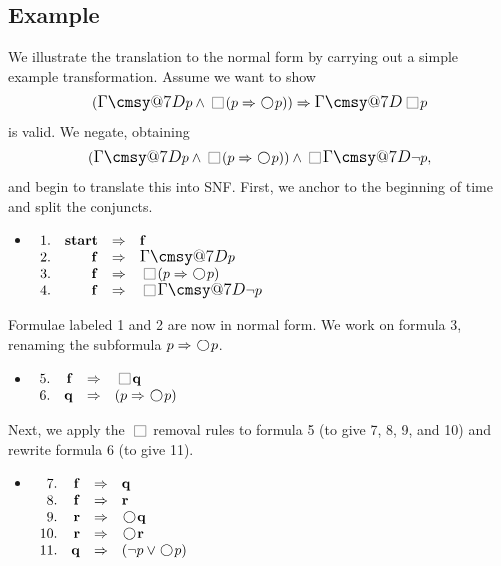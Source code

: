 \documentclass[nohyperref]{acmtrans2f}
\makeatletter
\def\sometime{\mathord{\hbox{\large$\mathchar"0\cmsy@7D$}}}
\newcommand{\always}{\raisebox{-.2ex}{
                           \mbox{\unitlength=0.9ex
                           \begin{picture}(2,2)
                           \linethickness{0.06ex}
                           \put(0,0){\line(1,0){2}}
                           \put(0,2){\line(1,0){2}}
                           \put(0,0){\line(0,1){2}}
                           \put(2,0){\line(0,1){2}}
                           \end{picture}}}
                          \,}
\newcommand{\next}{\!\raisebox{-.2ex}{ %
                        \mbox{\unitlength=0.9ex
                        \begin{picture}(2,2)
                        \linethickness{0.06ex}
                        \put(1,1){\circle{2}} %
                        \end{picture}}}       %
                        \,}
\let\imp=\Rightarrow
\def\lstart{\hbox{\rm\bf start}}
\makeatother
\begin{document}
\subsection{Example}
\label{eg.snf}
We illustrate the translation to the normal form by carrying out a
simple example transformation.
Assume we want to show
$$
(\sometime p \land \always(p \imp \next p)) \imp \sometime \always p
$$
is valid. We negate, obtaining
$$
(\sometime p \land \always(p \imp \next p)) \land \always \sometime \neg p,
$$
and begin to translate this into SNF.
First, we anchor to the beginning of time and split the conjuncts.
\begin{itemize}
\item[] $\begin{array}[t]{rrcl}
1. & \lstart & \imp & {\bf f} \\
2. & {\bf f} &  \imp & \sometime p \\
3. & {\bf f} & \imp & \always(p \imp \next p) \\
4. & {\bf f} & \imp & \always \sometime \neg p \\
\end{array}$
\end{itemize}
Formulae labeled 1 and 2 are now in normal form. We work on formula 3,
renaming the subformula $p \imp \next p$.
\begin{itemize}
\item[] $\begin{array}[t]{rrcl}
5. & {\bf f} & \imp & \always {\bf q} \\
6. & {\bf q} & \imp & (p \imp \next p) \\
\end{array}$
\end{itemize}
Next, we apply the $\always$ removal rules to formula 5 (to give 7, 8,
9, and 10) and rewrite formula 6 (to give 11).
\begin{itemize}
\item[] $\begin{array}[t]{rrcl}
7. & {\bf f} & \imp & {\bf q} \\
8. & {\bf f} & \imp & {\bf r} \\
9. & {\bf r} & \imp & \next {\bf q} \\
10. & {\bf r} & \imp & \next {\bf r} \\
11. & {\bf q} & \imp & (\neg p \lor \next p) \\
\end{array}$
\end{itemize}
\end{document}
